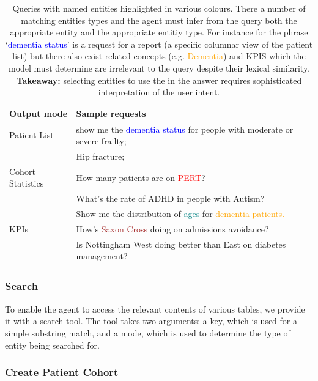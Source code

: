\documentclass[11pt]{article}
\begin{document}
\begin{table}[t]
\centering
\begin{tabular}{|p{2cm}|p{5cm}|}
\hline
	Output mode & Sample requests \\
\hline
\hline
	Patient List	& show me the \textcolor{blue}{dementia status} for people with moderate or severe frailty; \\
			& Hip fracture; \\ 
\hline
	Cohort Statistics 	& How many patients are on \textcolor{red}{PERT}? \\
				& What's the rate of ADHD in people with Autism? \\
				& Show me the distribution of \textcolor{teal}{ages} for \textcolor{orange}{dementia patients.} \\
\hline
	KPIs 	& How's \textcolor{brown}{Saxon Cross} doing on admissions avoidance? \\
		& Is Nottingham West doing better than East on diabetes management? \\	
\hline
\end{tabular}
\caption{
	Queries with named entities highlighted in various colours.
	There a number of matching entities types and the agent must infer from the query both the appropriate entity and the appropriate entitiy type.
	For instance for the phrase `\textcolor{blue}{dementia status}' is a request for a report (a specific columnar view of the patient list) but there also exist related
	concepts (e.g. \textcolor{orange}{Dementia}) and KPIS which the model must determine are irrelevant to the query despite their lexical similarity.
	\\ \textbf{Takeaway:} selecting entities to use the in the answer requires sophisticated interpretation of the user intent.  
}
\label{tab:sample-queries}
\end{table}



\subsubsection{Search}
To enable the agent to access the relevant contents of various tables, we provide it with a search tool.
The tool takes two arguments: a key, which is used for a simple substring match, and a mode, which is used to determine the type of entity being searched
for.

\subsubsection{Create Patient Cohort}
\end{document}
